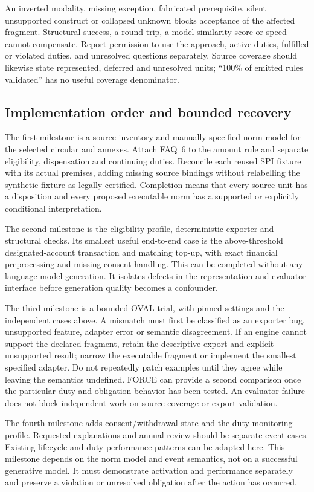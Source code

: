 An inverted modality, missing exception, fabricated prerequisite, silent
unsupported construct or collapsed unknown blocks acceptance of the affected
fragment. Structural success, a round trip, a model similarity score or speed
cannot compensate. Report permission to use the approach, active duties,
fulfilled or violated duties, and unresolved questions separately. Source
coverage should likewise state represented, deferred and unresolved units;
``100\% of emitted rules validated'' has no useful coverage denominator.

\subsection{Implementation order and bounded recovery}

The first milestone is a source inventory and manually specified norm model
for the selected circular and annexes. Attach FAQ~6 to the amount rule and
separate eligibility, dispensation and continuing duties. Reconcile each
reused SPI fixture with its actual premises, adding missing source bindings
without relabelling the synthetic fixture as legally certified. Completion
means that every source unit has a disposition and every proposed executable
norm has a supported or explicitly conditional interpretation.

The second milestone is the eligibility profile, deterministic exporter and
structural checks. Its smallest useful end-to-end case is the above-threshold
designated-account transaction and matching top-up, with exact financial
preprocessing and missing-consent handling. This can be completed without any
language-model generation. It isolates defects in the representation and
evaluator interface before generation quality becomes a confounder.

The third milestone is a bounded OVAL trial, with pinned settings and the
independent cases above. A mismatch must first be classified as an exporter
bug, unsupported feature, adapter error or semantic disagreement. If an
engine cannot support the declared fragment, retain the descriptive export
and explicit unsupported result; narrow the executable fragment or implement
the smallest specified adapter. Do not repeatedly patch examples until they
agree while leaving the semantics undefined. FORCE can provide a second
comparison once the particular duty and obligation behavior has been tested.
An evaluator failure does not block independent work on source coverage or
export validation.

The fourth milestone adds consent/withdrawal state and the duty-monitoring
profile. Requested explanations and annual review should be separate event
cases. Existing lifecycle and duty-performance patterns can be adapted here.
This milestone depends on the norm model and event semantics, not on a
successful generative model. It must demonstrate activation and performance
separately and preserve a violation or unresolved obligation after the action
has occurred.

